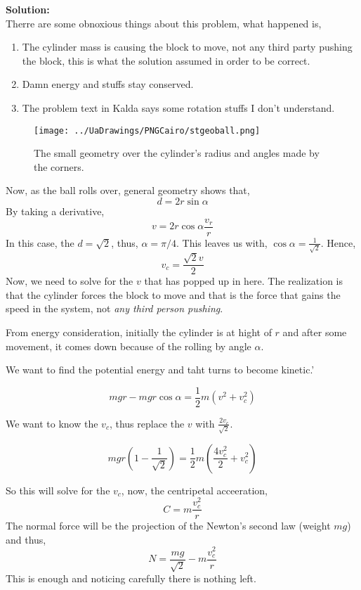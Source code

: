 \documentclass[a4paper]{article}
\theoremstyle{definition}
\begin{document}
\textbf{
    Solution:}\\
Therre are some obnoxious things about this problem, what happened is, 
\begin{enumerate}
    \item The cylinder mass is causing the block to move, not any third party pushing the block, this is what the solution assumed in order to be correct.
    \item Damn energy and stuffs stay conserved. 
    \item The problem text in Kalda says some rotation stuffs I don't understand.
\end{enumerate} 
\begin{figure} [hbtp]
    \centering
    \texttt{[image: ../UaDrawings/PNGCairo/stgeoball.png]}
    \caption{The small geometry over the cylinder's radius and angles made by the corners.}
    \label{ }
\end{figure} 
Now, as the ball rolls over, general geometry shows that, 
\[d = 2 r\sin \alpha \] 
By taking a derivative, 
\[v= 2r \cos \alpha \frac{v_r}{r}\]
In this case, the $d = \sqrt{2}$, thus, $\alpha = \pi/4$. This leaves us with, $\cos \alpha = \frac{ 1 }{ \sqrt{2} }$. 
Hence, 
\[v_c = \frac{ \sqrt{2}v }{ 2 }\]
Now, we need to solve for the $v$ that has popped up in here. The realization is that the cylinder
forces the block to move and that is the force that gains the speed in the system, not \emph{any third person pushing}. 

From energy consideration, initially the cylinder is at hight of $r$ and after some movement, it comes down because of the rolling
by angle $\alpha$. 

We want to find the potential energy and taht turns to become kinetic.'

\[mgr - mgr\cos \alpha = \frac{ 1 }{ 2 } m (v^2 + v_c^2)\]

We want to know the $v_c$, thus replace the $v$ with $\frac{ 2v_c }{ \sqrt{2} }$. 

\[ mgr (1 - \frac{ 1 }{ \sqrt{2} }) = \frac{ 1 }{ 2 } m \left( \frac{ 4 v_c^2  }{ 2 } + v_c^2  \right) \] 

So this will solve for the $v_c$, now, the centripetal acceeration,
\[ C = m \frac{ v_c^2 }{ r } \] 
The normal force will be the projection of the Newton's second law (weight $mg$) and thus,
\[ N = \frac{ mg }{ \sqrt{2} } - m \frac{ v_c^2 }{ r } \]
This is enough and noticing carefully there is nothing left.
\end{document}
